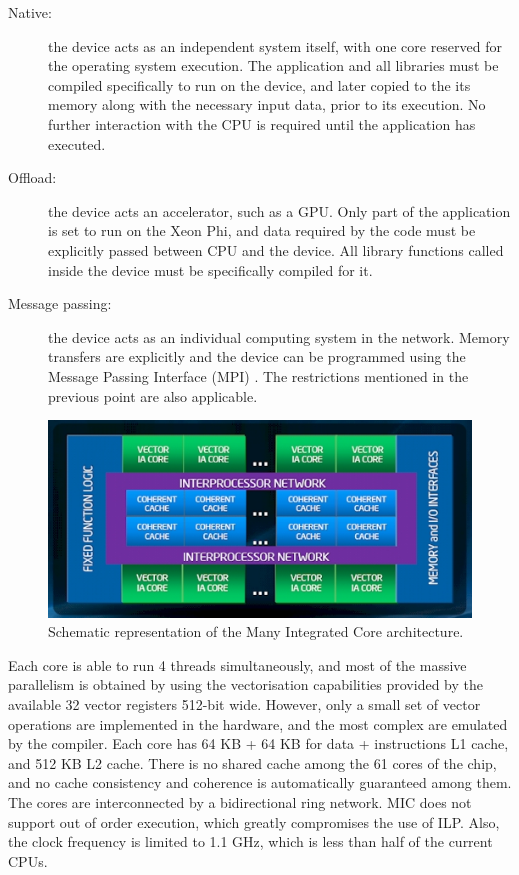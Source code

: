 \begin{description}
	\item[Native:] the device acts as an independent system itself, with one core reserved for the operating system execution. The application and all libraries must be compiled specifically to run on the device, and later copied to the its memory along with the necessary input data, prior to its execution. No further interaction with the CPU is required until the application has executed.
	\item[Offload:] the device acts an accelerator, such as a GPU. Only part of the application is set to run on the Xeon Phi, and data required by the code must be explicitly passed between CPU and the device. All library functions called inside the device must be specifically compiled for it.
	\item[Message passing:] the device acts as an individual computing system in the network. Memory transfers are explicitly and the device can be programmed using the Message Passing Interface (MPI) \cite{MPI}. The restrictions mentioned in the previous point are also applicable.
\end{description}

\begin{figure}[!htp]
	\begin{center}
		\includegraphics[scale=0.65]{imgs/mic.png}
		\caption{Schematic representation of the \intel Many Integrated Core architecture.}
		\label{fig:mic}
	\end{center}
\end{figure}

Each core is able to run 4 threads simultaneously, and most of the massive parallelism is obtained by using the vectorisation capabilities provided by the available 32 vector registers 512-bit wide. However, only a small set of vector operations are implemented in the hardware, and the most complex are emulated by the compiler. Each core has 64 KB + 64 KB for data + instructions L1 cache, and 512 KB L2 cache. There is no shared cache among the 61 cores of the chip, and no cache consistency and coherence is automatically guaranteed among them. The cores are interconnected by a bidirectional ring network. MIC does not support out of order execution, which greatly compromises the use of ILP. Also, the clock frequency is limited to 1.1 GHz, which is less than half of the current CPUs.

